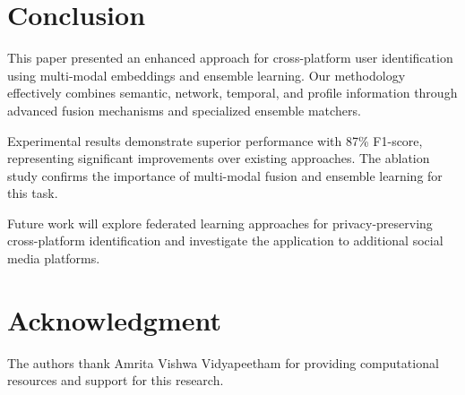 \documentclass[conference]{IEEEtran}
\begin{document}
\section{Conclusion}

This paper presented an enhanced approach for cross-platform user identification using multi-modal embeddings and ensemble learning. Our methodology effectively combines semantic, network, temporal, and profile information through advanced fusion mechanisms and specialized ensemble matchers.

Experimental results demonstrate superior performance with 87\% F1-score, representing significant improvements over existing approaches. The ablation study confirms the importance of multi-modal fusion and ensemble learning for this task.

Future work will explore federated learning approaches for privacy-preserving cross-platform identification and investigate the application to additional social media platforms.

\section*{Acknowledgment}
The authors thank Amrita Vishwa Vidyapeetham for providing computational resources and support for this research.
\end{document}
